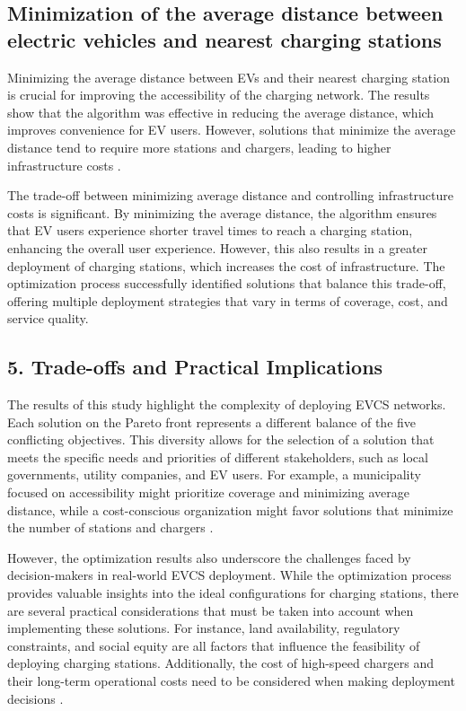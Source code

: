 \subsection{Minimization of the average distance between electric vehicles and nearest charging stations}

Minimizing the average distance between EVs and their nearest charging station is crucial for improving the accessibility of the charging network. The results show that the algorithm was effective in reducing the average distance, which improves convenience for EV users. However, solutions that minimize the average distance tend to require more stations and chargers, leading to higher infrastructure costs \citep{A multi-objective optimization model for electric vehicle charging station location planning}.

The trade-off between minimizing average distance and controlling infrastructure costs is significant. By minimizing the average distance, the algorithm ensures that EV users experience shorter travel times to reach a charging station, enhancing the overall user experience. However, this also results in a greater deployment of charging stations, which increases the cost of infrastructure. The optimization process successfully identified solutions that balance this trade-off, offering multiple deployment strategies that vary in terms of coverage, cost, and service quality.

\subsection{5. Trade-offs and Practical Implications}

The results of this study highlight the complexity of deploying EVCS networks. Each solution on the Pareto front represents a different balance of the five conflicting objectives. This diversity allows for the selection of a solution that meets the specific needs and priorities of different stakeholders, such as local governments, utility companies, and EV users. For example, a municipality focused on accessibility might prioritize coverage and minimizing average distance, while a cost-conscious organization might favor solutions that minimize the number of stations and chargers \citep{A multi-objective optimization model for electric vehicle charging station location planning}.

However, the optimization results also underscore the challenges faced by decision-makers in real-world EVCS deployment. While the optimization process provides valuable insights into the ideal configurations for charging stations, there are several practical considerations that must be taken into account when implementing these solutions. For instance, land availability, regulatory constraints, and social equity are all factors that influence the feasibility of deploying charging stations. Additionally, the cost of high-speed chargers and their long-term operational costs need to be considered when making deployment decisions \citep{A genetic algorithm-based optimization for the location of electric vehicle charging stations}.

